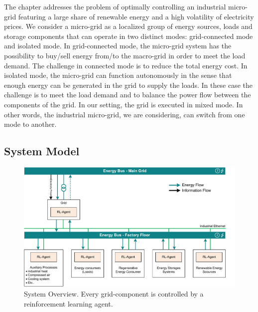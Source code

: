 The chapter addresses the problem of optimally controlling an industrial micro-grid featuring a large share of renewable energy and a high volatility of electricity prices. We consider a micro-grid as a localized group of energy sources, loads and storage components that can operate in two distinct modes: grid-connected mode and isolated mode. In grid-connected mode, the micro-grid system has the possibility to buy/sell energy from/to the macro-grid in order to meet the load demand. The challenge in connected mode is to reduce the total energy cost. In isolated mode, the micro-grid can function autonomously in the sense that enough energy can be generated in the grid to supply the loads. In these case the challenge is to meet the load demand and to balance the power flow between the components of the grid. In our setting, the grid is executed in mixed mode. In other words, the industrial micro-grid, we are considering, can switch from one mode to another.

\subsection{System Model}
\label{subsec:31}

%
\begin{figure}[b]
\includegraphics[scale=.65]{images/System_Model}
%
%
\caption{System Overview. Every grid-component is controlled by a reinforcement learning agent.}
\label{fig:system_model}       %
\end{figure}

